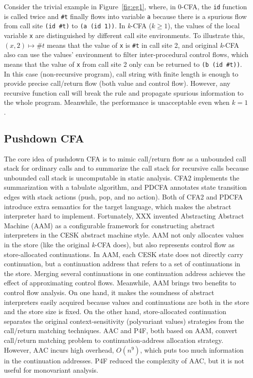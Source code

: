 \documentclass{article}
\begin{document}
Consider the trivial example in Figure~\ref{fig:eg1}, where, in 0-CFA, the \verb|id| function is called twice and \verb|#t| finally flows into variable \verb|a| because there is a spurious flow from call site \verb|(id #t)| to \verb|(a (id 1))|.
In \textit{k}-CFA ($k \geq 1$), the values of the local variable \verb|x| are distinguished by different call site environments.
To illustrate this, $(x, 2) \mapsto \#t$ means that the value of \verb|x| is \verb|#t| in call site 2, and original \textit{k}-CFA also can use the values' environment to filter inter-procedural control flows, which means that the value of \verb|x| from call site 2 only can be returned to \verb|(b (id #t))|.
In this case (non-recursive program), call string with finite length is enough to provide precise call/return flow (both value and control flow).
However, any recursive function call will break the rule and propagate spurious information to the whole program.
Meanwhile, the performance is unacceptable even when $k = 1$.

\subsection{Pushdown CFA}
The core idea of pushdown CFA is to mimic call/return flow as a unbounded call stack for ordinary calls and to summarize the call stack for recursive calls because unbounded call stack is uncomputable in static analysis.
CFA2 %
implements the summarization with a tabulate algorithm, %
and PDCFA %
annotates state transition edges with stack actions (push, pop, and no action).
Both of CFA2 and PDCFA introduce extra semantics for the target language, which makes the abstract interpreter hard to implement.
Fortunately, XXX %
invented Abstracting Abstract Machine (AAM) %
as a configurable framework for constructing abstract interpreters in the CESK abstract machine style. %
AAM not only allocates values in the store (like the original \textit{k}-CFA does), but also represents control flow as store-allocated continuations.
In AAM, each CESK state does not directly carry continuation, but a continuation address that refers to a set of continuations in the store.
Merging several continuations in one continuation address achieves the effect of approximating control flows.
Meanwhile, AAM brings two benefits to control flow analysis.
On one hand, it makes the soundness of abstract interpreters easily acquired because values and continuations are both in the store and
the store size is fixed.
On the other hand, store-allocated continuation separates the original context-sensitivity (polyvariant values) strategies from
the call/return matching techniques.
AAC and P4F, %
both based on AAM, convert call/return matching problem to continuation-address allocation strategy.
However, AAC incurs high overhead, $O(n^9)$, which puts too much information in the continuation addresses.
P4F reduced the complexity of AAC, but it is not useful for monovariant analysis.
\end{document}
